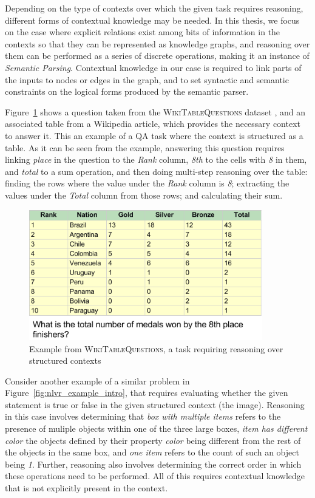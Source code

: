 Depending on the type of contexts over which the given task requires reasoning, different forms of
contextual knowledge may be needed.  In this thesis, we focus on the case where explicit relations
exist among bits of information in the contexts so that they can be represented as knowledge graphs,
and reasoning over them can be performed as a series of discrete operations, making it an instance of
\emph{Semantic Parsing}. Contextual knowledge in our case is required to link parts of the inputs to nodes or
edges in the graph, and to set syntactic and semantic constraints on the logical forms produced by
the semantic parser.

Figure~\ref{fig:wikitables_example} shows a question taken from the \textsc{WikiTableQuestions}
dataset \citep{pasupat2015compositional}, and an associated table from a Wikipedia article, which
provides the necessary context to answer it. This an example of a QA task where the context is
structured as a table. As it can be seen from the example, answering this question requires linking
\textit{place} in the question to the \textit{Rank} column, \textit{8th} to the cells with
\textit{8} in them, and \textit{total} to a sum operation, and then doing multi-step reasoning over
the table: finding the rows where the value under the \textit{Rank} column is \textit{8}; extracting
the values under the \textit{Total} column from those rows; and calculating their sum.
\begin{figure}
	\begin{center}
		\includegraphics[width=4in]{figures/wikitables_example.png}
	\caption{Example from \textsc{WikiTableQuestions}, a task requiring reasoning over
	structured contexts}\label{fig:wikitables_example}
	\end{center}
\end{figure}

Consider another example of a similar problem in Figure~\ref{fig:nlvr_example_intro}, that requires
evaluating whether the given statement is true or false in the given structured context (the image).
Reasoning in this case involves determining that \textit{box with multiple items} refers to the
presence of muliple objects within one of the three large boxes, \textit{item has different color}
the objects defined by their property \textit{color} being different from the rest of the objects in
the same box, and \textit{one item} refers to the count of such an object being \textit{1}. Further,
reasoning also involves determining the correct order in which these operations need to be
performed. All of this requires contextual knowledge that is not explicitly present in the context.

